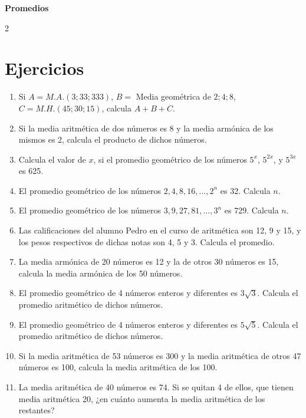 \documentclass[10pt]{article}
\begin{document}
	\begin{center}
		\Large\bfseries Promedios
	\end{center}

\begin{multicols}{2}
	\section*{Ejercicios}
		\begin{enumerate}[label=\textbf{\arabic*.}, itemsep=0.4cm]
			\item Si $A = M.A.(3; 33; 333)$, $B =$ Media geométrica de $2; 4 ; 8$, $C = M.H.(45; 30; 15)$, calcula $A + B + C$.

			\item Si la media aritmética de dos números es 8 y la media armónica de los mismos es 2, calcula el producto de dichos números.

			\item Calcula el valor de $x$, si el promedio geométrico de los números $5^x$, $5^{2x}$, y $5^{3x}$ es 625.

			\item El promedio geométrico de los números $2, 4, 8, 16, \dots, 2^n$ es 32. Calcula $n$.

			\item El promedio geométrico de los números $3, 9, 27, 81, \dots, 3^n$ es 729. Calcula $n$.

			\item Las calificaciones del alumno Pedro en el curso de aritmética son 12, 9 y 15, y los pesos respectivos de dichas notas son 4, 5 y 3. Calcula el promedio.

			\item La media armónica de 20 números es 12 y la de otros 30 números es 15, calcula la media armónica de los 50 números.

			\item El promedio geométrico de 4 números enteros y diferentes es $3\sqrt{3}$. Calcula el promedio aritmético de dichos números.

			\item El promedio geométrico de 4 números enteros y diferentes es $5\sqrt{5}$. Calcula el promedio aritmético de dichos números.

			\item Si la media aritmética de 53 números es 300 y la media aritmética de otros 47 números es 100, calcula la media aritmética de los 100.

			\item La media aritmética de 40 números es 74. Si se quitan 4 de ellos, que tienen media aritmética 20, ¿en cuánto aumenta la media aritmética de los restantes?


\end{enumerate}
\end{multicols}
\end{document}
